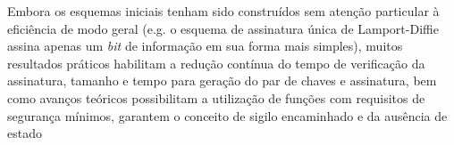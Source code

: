 \documentclass{article}
\begin{document}
Embora os esquemas iniciais tenham sido construídos sem atenção particular
à eficiência de modo geral (e.g. o esquema de assinatura única de
Lamport-Diffie assina apenas um \emph{bit} de informação em sua forma mais
simples), muitos resultados práticos habilitam a redução contínua do tempo de
verificação da assinatura, tamanho e tempo para geração do par de chaves
e assinatura, bem como avanços teóricos possibilitam a utilização de funções
com requisitos de segurança mínimos, garantem o conceito de sigilo encaminhado
e da ausência de estado




\end{document}
